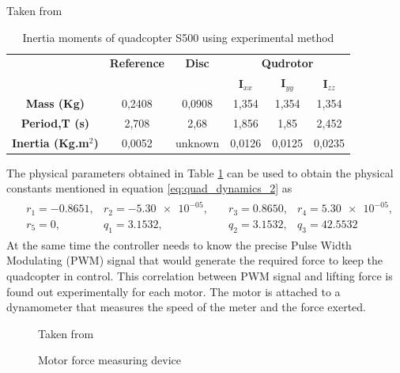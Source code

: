 \documentclass[letterpaper%
, twoside%
, 12pt%
,memoire%
, english%
,creativecommons,hyperref%
]{thETS}
\begin{document}
\begin{table}
	\parbox{0.65\textwidth}{
		\begin{center}
		\caption{Inertia moments of quadcopter S500 using experimental method\label{tim}}Taken from \citep{RN121}
		\end{center}	
	}
	\begin{tabular}{|c|c|c|c|c|c|}
		\hline
		{\bf } & {\bf Reference} & {\bf Disc} & \multicolumn{3}{|c|}{\bf Qudrotor} \\
		\cline{4-6}
		& & & \bf I$_{xx}$ & \bf I$_{yy}$ & \bf I$_{zz}$\\
		\hline
		\bf Mass (Kg) & 0,2408 & 0,0908 & 1,354 & 1,354 & 1,354\\
		\hline
		\bf Period,T (s)& 2,708 & 2,68 & 1,856 & 1,85 & 2,452\\
	    \hline
		\bf Inertia (Kg.m$^2$)& 0,0052 & unknown & 0,0126 & 0,0125 & 0,0235 \\
		\hline
	\end{tabular}
\end{table}
The physical parameters obtained in Table \ref{tim} can be used to obtain the physical constants mentioned in equation \eqref{eq:quad_dynamics_2} as
\begin{align}
\begin{aligned}
&r_{1}=-0.8651, 
&r_{2}=\num{-5.30e-05}, \quad
&r_{3}= 0.8650, 
&r_{4}= \num{5.30e-05} ,\\
&r_{5}=0, 
&q_{1}= 3.1532, \quad \quad \quad
&q_{2}= 3.1532, 
&q_{3}= 42.5532
\end{aligned}
\end{align}
At the same time the controller needs to know the precise Pulse Width Modulating (PWM) signal that would generate the required force to keep the quadcopter in control. This correlation between PWM signal and lifting force is found out experimentally for each motor. The motor is attached to a dynamometer that measures the speed of the meter and the force exerted. 
\begin{figure}
	\centering
	\parbox{0.75\textwidth}{
		\begin{center}
		\caption{Motor force measuring device\label{rcd_c2}}Taken from \citep{RN121}
		\end{center}	
	}
\end{figure}
\end{document}
